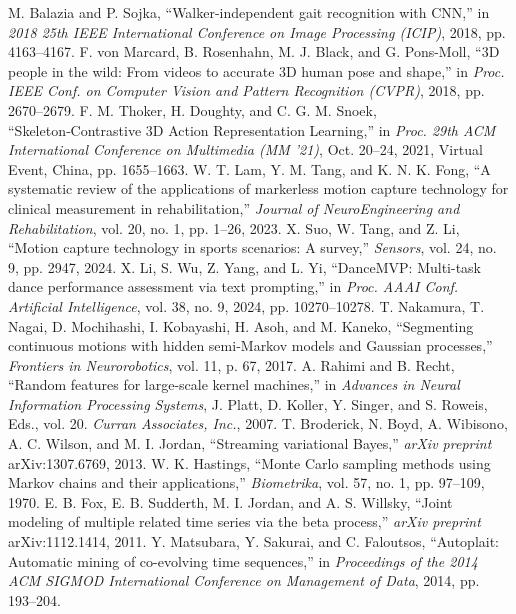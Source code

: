 \documentclass[conference]{IEEEtran}
\begin{document}
\begin{thebibliography}{00}
 M. Balazia and P. Sojka, ``Walker-independent gait recognition with CNN,'' in \textit{2018 25th IEEE International Conference on Image Processing (ICIP)}, 2018, pp. 4163--4167.
 F. von Marcard, B. Rosenhahn, M. J. Black, and G. Pons-Moll, ``3D people in the wild: From videos to accurate 3D human pose and shape,'' in \textit{Proc. IEEE Conf. on Computer Vision and Pattern Recognition (CVPR)}, 2018, pp. 2670--2679.
 F. M. Thoker, H. Doughty, and C. G. M. Snoek, “Skeleton‑Contrastive 3D Action Representation Learning,” in \textit{Proc. 29th ACM International Conference on Multimedia (MM ’21)}, Oct. 20--24, 2021, Virtual Event, China, pp. 1655--1663.
 W. T. Lam, Y. M. Tang, and K. N. K. Fong, “A systematic review of the applications of markerless motion capture technology for clinical measurement in rehabilitation,” \textit{Journal of NeuroEngineering and Rehabilitation}, vol. 20, no. 1, pp. 1--26, 2023.
 X. Suo, W. Tang, and Z. Li, “Motion capture technology in sports scenarios: A survey,” \textit{Sensors}, vol. 24, no. 9, pp. 2947, 2024.
 X. Li, S. Wu, Z. Yang, and L. Yi, ``DanceMVP: Multi-task dance performance assessment via text prompting,'' in \textit{Proc. AAAI Conf. Artificial Intelligence}, vol. 38, no. 9, 2024, pp. 10270--10278.
 T. Nakamura, T. Nagai, D. Mochihashi, I. Kobayashi, H. Asoh, and M. Kaneko, “Segmenting continuous motions with hidden semi-Markov models and Gaussian processes,” \textit{Frontiers in Neurorobotics}, vol. 11, p. 67, 2017.
 A. Rahimi and B. Recht, “Random features for large-scale kernel machines,” in \textit{Advances in Neural Information Processing Systems}, J. Platt, D. Koller, Y. Singer, and S. Roweis, Eds., vol. 20. \textit{Curran Associates, Inc.}, 2007.
 T. Broderick, N. Boyd, A. Wibisono, A. C. Wilson, and M. I. Jordan, “Streaming variational Bayes,” \textit{arXiv preprint} arXiv:1307.6769, 2013.
 W. K. Hastings, “Monte Carlo sampling methods using Markov chains and their applications,” \textit{Biometrika}, vol. 57, no. 1, pp. 97--109, 1970.
 E. B. Fox, E. B. Sudderth, M. I. Jordan, and A. S. Willsky, “Joint modeling of multiple related time series via the beta process,” \textit{arXiv preprint} arXiv:1112.1414, 2011.
 Y. Matsubara, Y. Sakurai, and C. Faloutsos, “Autoplait: Automatic mining of co-evolving time sequences,” in \textit{Proceedings of the 2014 ACM SIGMOD International Conference on Management of Data}, 2014, pp. 193--204.

\end{thebibliography}
\end{document}
